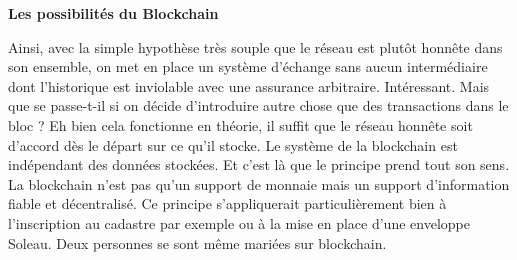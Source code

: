 \documentclass[11pt,twoside,a4paper]{article}
\begin{document}
\textbf{Les possibilit{\'e}s du Blockchain} %

Ainsi, avec la simple hypoth{\`e}se tr{\`e}s souple que le r{\'e}seau est plut{\^o}t honn{\^e}te dans son ensemble, on met en place un syst{\`e}me d'{\'e}change sans aucun interm{\'e}diaire dont l'historique est inviolable avec une assurance arbitraire. Int{\'e}ressant. Mais que se passe-t-il si on d{\'e}cide d'introduire autre chose que des transactions dans le bloc ? Eh bien cela fonctionne en th{\'e}orie, il suffit que le r{\'e}seau honn{\^e}te soit d'accord d{\`e}s le d{\'e}part sur ce qu'il stocke. Le syst{\`e}me de la blockchain est ind{\'e}pendant des donn{\'e}es stock{\'e}es. Et c'est l{\`a} que le principe prend tout son sens. La blockchain n'est pas qu'un support de monnaie mais un support d'information fiable et d{\'e}centralis{\'e}. Ce principe s'appliquerait particuli{\`e}rement bien {\`a} l'inscription au cadastre par exemple ou {\`a} la mise en place d'une enveloppe Soleau. Deux personnes se sont m{\^e}me mari{\'e}es sur blockchain.~\\
\end{document}
